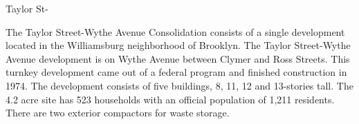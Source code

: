 Taylor St-\par \vspace{.7\baselineskip}The Taylor Street-Wythe Avenue Consolidation consists of a single development located in the Williamsburg neighborhood of Brooklyn. The Taylor Street-Wythe Avenue development is on Wythe Avenue between Clymer and Ross Streets. This turnkey development came out of a federal program and finished construction in 1974. The development consists of five buildings, 8, 11, 12 and 13-stories tall. The 4.2 acre site has 523 households with an official population of 1,211 residents. There are two exterior compactors for waste storage.